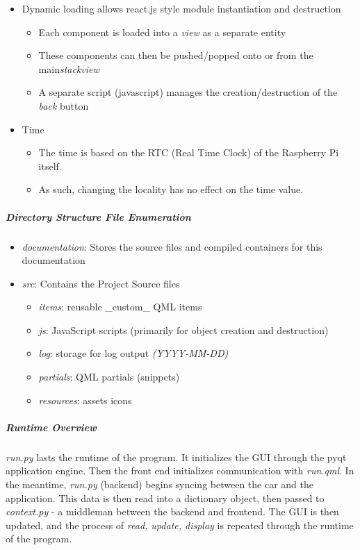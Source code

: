 \documentclass{article}
\numberwithin{figure}{section}
\begin{document}
\begin{itemize}
\item
  Dynamic loading allows react.js style module instantiation and destruction

  \begin{itemize}
  \item
    Each component is loaded into a \emph{view} as a separate entity
  \item
    These components can then be pushed/popped onto or from the
    main\emph{stackview}
  \item
    A separate script (javascript) manages the creation/destruction of
    the \emph{back} button
  \end{itemize}
\item
  Time

  \begin{itemize}
  \item
    The time is based on the RTC (Real Time Clock) of the Raspberry Pi
    itself.
  \item
    As such, changing the locality has no effect on the time value.
  \end{itemize}
\end{itemize}

\subparagraph{Directory Structure \textbar{} File Enumeration}
\begin{itemize}
    \item \emph{documentation}: Stores the source files and compiled containers for this documentation\\
    \item \emph{src}: Contains the Project Source files

    \begin{itemize}
        \item \emph{items}: reusable \_custom\_ QML items
        \item \emph{js}: JavaScript scripts (primarily for object creation and destruction)
        \item \emph{log}: storage for log output \emph{(YYYY-MM-DD)}
        \item \emph{partials}: QML partials (snippets)
        \item \emph{resources}: assets \textbar{} icons
    \end{itemize}
\end{itemize}

\subparagraph{Runtime Overview}
{
  \emph{run.py} lasts the runtime of the program. It initializes the GUI through the pyqt application     engine. Then the front end initializes communication with \emph{run.qml}.  In the meantime, \emph{run.py}
     (backend) begins syncing between the car and the application.  This data is then read into a dictionary object, then passed to \emph{context.py} - a middleman between the backend and frontend.
     The GUI is then updated, and the process of \emph{read, update, display} is repeated through the runtime of the program.
}
\end{document}
